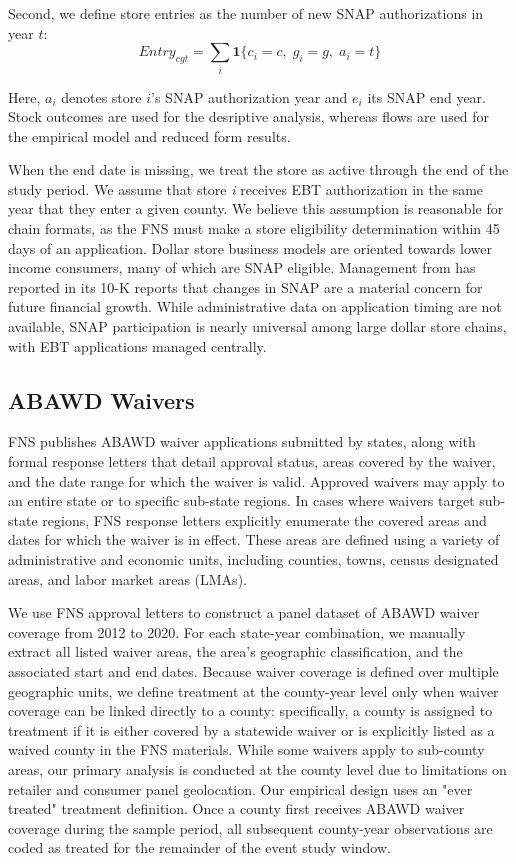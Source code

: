 \documentclass[12pt]{article}
\begin{document}
Second, we define store entries as the number of new SNAP authorizations in year \(t\):
\begin{equation}
    Entry_{cgt} = \sum_i \mathbf{1}\{c_i = c,\; g_i = g,\; a_i = t\}
\end{equation}

Here, \(a_i\) denotes store \(i\)’s SNAP authorization year and \(e_i\) its SNAP end year. Stock outcomes are used for the desriptive analysis, whereas flows are used for the empirical model and reduced form results.

When the end date is missing, we treat the store as active through the end of the study period. We assume that store \textit{i} receives EBT authorization in the same year that they enter a given county. We believe this assumption is reasonable for chain formats, as the FNS must make a store eligibility determination within 45 days of an application. Dollar store business models are oriented towards lower income consumers, many of which are SNAP eligible. Management from   \cite{dollargeneral2025form10k} has reported in its 10-K reports that changes in SNAP are a material concern for future financial growth. While administrative data on application timing are not available, SNAP participation is nearly universal among large dollar store chains, with EBT applications managed centrally.

\subsection{ABAWD Waivers}

FNS publishes ABAWD waiver applications submitted by states, along with formal response letters that detail approval status, areas covered by the waiver, and the date range for which the waiver is valid. Approved waivers may apply to an entire state or to specific sub-state regions. In cases where waivers target sub-state regions, FNS response letters explicitly enumerate the covered areas and dates for which the waiver is in effect. These areas are defined using a variety of administrative and economic units, including counties, towns, census designated areas, and labor market areas (LMAs).

We use FNS approval letters to construct a panel dataset of ABAWD waiver coverage from 2012 to 2020. For each state-year combination, we manually extract all listed waiver areas, the area's geographic classification, and the associated start and end dates. Because waiver coverage is defined over multiple geographic units, we define treatment at the county-year level only when waiver coverage can be linked directly to a county: specifically, a county is assigned to treatment if it is either covered by a statewide waiver or is explicitly listed as a waived county in the FNS materials. While some waivers apply to sub-county areas, our primary analysis is conducted at the county level due to limitations on retailer and consumer panel geolocation. Our empirical design uses an "ever treated" treatment definition. Once a county first receives ABAWD waiver coverage during the sample period, all subsequent county-year observations are coded as treated for the remainder of the event study window. 
\end{document}

